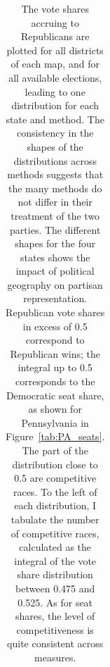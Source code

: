 \begin{table}
\begin{tabular}{lcccccccc}
 \hline \hline
\end{tabular}
\caption{
The vote shares accruing to Republicans are plotted for
  all districts of each map, and for all available elections,
  leading to one distribution for each state and method.
The consistency in the shapes of the distributions across methods
  suggests that the many methods do not differ in their treatment of the two parties.
The different shapes for the four states shows the impact of
  political geography on partisan representation.
Republican vote shares in excess of 0.5 correspond to Republican wins;
  the integral up to 0.5 corresponds to the Democratic seat share,
  as shown for Pennsylvania in Figure~\ref{tab:PA_seats}.
The part of the distribution close to 0.5 are competitive races.
To the left of each distribution,
  I tabulate the number of competitive races, calculated as the integral of the vote share 
  distribution between 0.475 and 0.525.
As for seat shares, the level of competitiveness is quite consistent across measures.
}\label{tab:competitiveness}
\end{table}
 